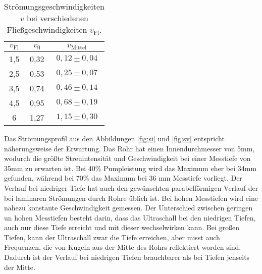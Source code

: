 \begin{table}[H]
    \centering
    \caption{Strömungsgeschwindigkeiten $v$ bei verschiedenen Fließgeschwindigkeiten $v_\text{Fl}$.}
    \label{tab:vm}
    \begin{tabular}{S[table-format=1.1] S[table-format=1.2] c}
        \toprule
        {$v_\text{Fl}$}&{$v_0$}&{$v_\text{Mittel}$}\\
        ,5 & 0,32 & $0,12 \pm 0,04$ \\
        2,5 & 0,53 & $0,25 \pm 0,07$ \\
        3,5 & 0,74 & $0,46 \pm 0,14$ \\
        4,5 & 0,95 & $0,68 \pm 0,19$ \\
        6 & 1,27 & $1,15 \pm 0,30$ \\
        \bottomrule
    \end{tabular}
  \end{table}
  
  \noindent Das Strömungsprofil aus den Abbildungen \ref{fig:si} und \ref{fig:sv} entspricht näherungsweise der
  Erwartung. Das Rohr hat einen Innendurchmesser von 5mm, wodurch die größte Streuintensität und Geschwindigkeit bei einer Messtiefe von
  35mm zu erwarten ist. Bei 40\% Pumpleistung wird das Maximum eher bei 34mm gefunden, während bei 70\% das Maximum bei 36 mm Messtiefe vorliegt.
  Der Verlauf bei niedriger Tiefe hat auch den gewünschten parabelförmigen Verlauf der bei laminaren Strömungen durch Rohre üblich ist.
  Bei hohen Messtiefen wird eine nahezu konstante Geschwindigkeit gemessen. Der Unterschied zwischen geringen un hohen Messtiefen besteht darin, dass
  das Ultraschall bei den niedrigen Tiefen, auch nur diese Tiefe erreicht und mit dieser wechselwirken kann. Bei großen Tiefen, kann der Ultraschall zwar
  die Tiefe erreichen, aber misst auch Frequenzen, die von Kugeln aus der Mitte des Rohrs reflektiert worden sind. Dadurch ist der Verlauf bei niedrigen
  Tiefen brauchbarer als bei Tiefen jenseits der Mitte.   
  \label{sec:Diskussion}
